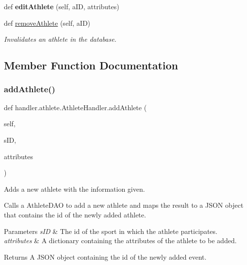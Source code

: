 \begin{DoxyCompactItemize}
\mbox{\label{classhandler_1_1athlete_1_1_athlete_handler_af2953ad06fe27a2bd718a83cde63272b}} 
def {\bfseries edit\+Athlete} (self, a\+ID, attributes)
\item 
def \hyperlink{classhandler_1_1athlete_1_1_athlete_handler_a9f3ea8fb6c3c156f89c2b2a5bda6e689}{remove\+Athlete} (self, a\+ID)
\begin{DoxyCompactList}\small\item\em Invalidates an athlete in the database. \end{DoxyCompactList}\end{DoxyCompactItemize}


\subsection{Member Function Documentation}
\mbox{\label{classhandler_1_1athlete_1_1_athlete_handler_a08fe0c2dab373f26b69dbab68a1b2a72}} 
\subsubsection{\texorpdfstring{add\+Athlete()}{addAthlete()}}
{\footnotesize\ttfamily def handler.\+athlete.\+Athlete\+Handler.\+add\+Athlete (\begin{DoxyParamCaption}\item[{}]{self,  }\item[{}]{s\+ID,  }\item[{}]{attributes }\end{DoxyParamCaption})}



Adds a new athlete with the information given. 

Calls a Athlete\+D\+AO to add a new athlete and maps the result to a J\+S\+ON object that contains the id of the newly added athlete.


\begin{DoxyParams}{Parameters}
{\em s\+ID} & The id of the sport in which the athlete participates. \\
\hline
{\em attributes} & A dictionary containing the attributes of the athlete to be added. \\
\hline
\end{DoxyParams}
\begin{DoxyReturn}{Returns}
A J\+S\+ON object containing the id of the newly added event. 
\end{DoxyReturn}
\mbox{\label{classhandler_1_1athlete_1_1_athlete_handler_a7261ed3d7231ef7bdb261863414be608}} 
